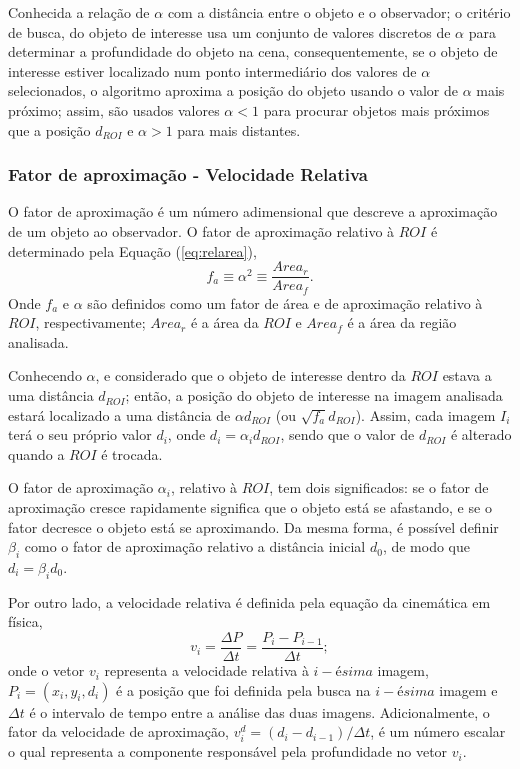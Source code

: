 Conhecida a relação de $\alpha$ com a distância entre o objeto e o observador; 
o critério de busca, do objeto de interesse usa um conjunto de valores 
discretos de $\alpha$ para determinar a profundidade do objeto na cena, 
consequentemente, se o objeto de interesse estiver localizado num ponto intermediário dos valores
de $\alpha$ selecionados, o algoritmo aproxima a posição do objeto 
usando o valor de $\alpha$ mais próximo; assim, são usados valores $\alpha<1$
para procurar objetos mais próximos que a posição $d_{ROI}$ e $\alpha>1$ para mais distantes.



\subsubsection{Fator de aproximação - Velocidade Relativa}

O fator de aproximação é um número adimensional que descreve a
aproximação de um objeto ao observador.
O fator de aproximação relativo à $ROI$ é determinado pela Equação (\ref{eq:relarea}),
\begin{equation}\label{eq:relarea}
f_a \equiv \alpha^2 \equiv \frac{Area_r}{Area_f}.
\end{equation}
Onde $f_a$ e $\alpha$ são definidos como um fator de área e de aproximação relativo à $ROI$,
respectivamente; $Area_r$ é a área da $ROI$ e $Area_f$ é a área da região analisada.

Conhecendo $\alpha$, e considerado que o objeto de interesse dentro da $ROI$ estava a uma distância $d_{ROI}$; então,
a posição do objeto de interesse na imagem analisada 
estará localizado a uma distância de $\alpha d_{ROI}$ (ou $\sqrt{f_a} d_{ROI}$). Assim, cada  imagem $I_i$
terá o seu próprio  valor $d_i$, onde $d_i=\alpha_i d_{ROI}$, sendo que o valor de $d_{ROI}$
é alterado quando a $ROI$ é trocada.

O fator de aproximação $\alpha_i$, relativo à $ROI$, tem 
dois significados: se o fator de aproximação cresce rapidamente 
significa que o objeto está se afastando, e se o fator decresce o objeto está se aproximando.
Da mesma forma, é possível definir $\beta_i$ como o fator de aproximação relativo
a distância inicial $d_0$, de modo que $d_i=\beta_i d_0$.

Por outro lado, a velocidade relativa é definida pela equação da cinemática em física,
\begin{equation}
 v_i = \frac{\Delta P}{\Delta t}= \frac{P_i-P_{i-1}}{\Delta t};
\end{equation}
onde o vetor $v_i$ representa a velocidade relativa à $i-ésima$ imagem, $P_i=(x_i,y_i,d_i)$ é a posição que
foi definida pela busca na $i-ésima$ imagem e $\Delta t$ é o intervalo de tempo entre a análise das duas imagens.
Adicionalmente, o fator da velocidade de aproximação, $v^d_i=(d_i-d_{i-1})/{\Delta t}$, 
é um número escalar o qual representa a componente
responsável pela profundidade no vetor $v_i$.

